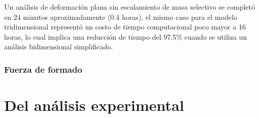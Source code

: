 Un análisis de deformación plana sin escalamiento de masa selectivo se completó en 24 minutos 
aproximadamente (0.4 horas), el mismo caso para el modelo tridimensional representó 
un costo de tiempo computacional poco mayor a 16 horas, lo cual implica una reducción de tiempo 
del 97.5\% cuando se utiliza un análisis bidimensional simplificado.

\subsubsection{Fuerza de formado}



\section{Del análisis experimental}


